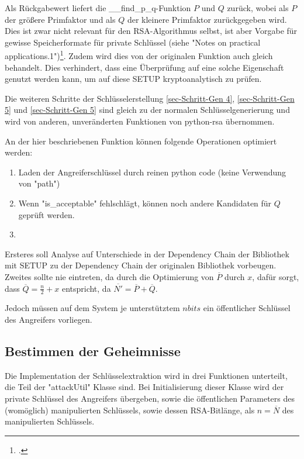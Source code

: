             Als Rückgabewert liefert die \_\_find\_p\_q-Funktion $P$ und $Q$ zurück, wobei als $P$ der größere Primfaktor und als $Q$ der kleinere Primfaktor zurückgegeben wird. Dies ist zwar nicht relevant für den \ac{RSA}-Algorithmus selbst, ist aber Vorgabe für gewisse Speicherformate für private Schlüssel (siehe "Notes on practical applications.1")\footcite[1]{dimgt:rsa}. Zudem wird dies von der originalen Funktion auch gleich behandelt. Dies verhindert, dass eine Überprüfung auf eine solche Eigenschaft genutzt werden kann, um auf diese \ac{SETUP} kryptoanalytisch zu prüfen.

            Die weiteren Schritte der Schlüsselerstellung \ref{sec-Schritt-Gen 4}, \ref{sec-Schritt-Gen 5} und \ref{sec-Schritt-Gen 5} sind gleich zu der normalen Schlüsselgenerierung und wird von anderen, unveränderten Funktionen von python-rsa übernommen.

            An der hier beschriebenen Funktion können folgende Operationen optimiert werden:
            \begin{enumerate}
                \item Laden der Angreiferschlüssel durch reinen python code (keine Verwendung von "path")
                \item Wenn "is\_acceptable" fehlschlägt, können noch andere Kandidaten für $Q$ geprüft werden.
                \item 
            \end{enumerate}
            Ersteres soll Analyse auf Unterschiede in der Dependency Chain der Bibliothek mit \ac{SETUP} zu der Dependency Chain der originalen Bibliothek vorbeugen.
            Zweites sollte nie eintreten, da durch die Optimierung von $\overline{P}$ durch $x$, dafür sorgt, dass $\overline{Q} = \frac{n}{2} + x$ entspricht, da $\overline{N'} = \overline{P} + \overline{Q}$.

            Jedoch müssen auf dem System je unterstütztem $nbits$ ein öffentlicher Schlüssel des Angreifers vorliegen.

        \subsection{Bestimmen der Geheimnisse}
            Die Implementation der Schlüsselextraktion wird in drei Funktionen unterteilt, die Teil der "attackUtil" Klasse sind. Bei Initialisierung dieser Klasse wird der private Schlüssel des Angreifers übergeben, sowie die öffentlichen Parameters des (womöglich) manipulierten Schlüssels, sowie dessen RSA-Bitlänge, als $n = \overline{N}$ des manipulierten Schlüssels.


